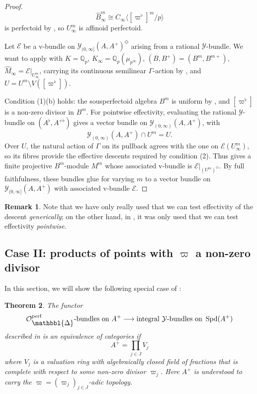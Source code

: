 \documentclass[10pt,twoside]{article}
\numberwithin{equation}{section}
\theoremstyle{plain}
\newtheorem{mythm}{Theorem}[section]
\theoremstyle{definition}
\newtheorem{myrem}[mythm]{Remark}
\DeclareMathOperator{\Spd}{Spd}
\newcommand{\QQ}{\mathbb{Q}}
\newcommand{\MCE}{\mathcal{E}}
\newcommand{\MCO}{\mathcal{O}}
\newcommand{\MCY}{\mathcal{Y}}
\let \diamond \Diamond
\DeclareMathOperator{\perf}{perf}
\newcommand{\Prism}{{\mathlarger{\mathbbl{\Delta}}}}
\newcommand{\Yoc}{\MCY_{(0,\infty]}}
\newcommand{\Yoo}{\MCY_{(0,\infty)}}
\newcommand{\OpP}{\MCO^{\perf}_{\Prism}}
\begin{document}
\begin{proof}
\[\hat B^m_\infty\cong C_\infty\langle [\varpi^\flat]^m/p\rangle\]
is perfectoid by \cite[Theorem 6.1.10]{SW20}, so \(U_\infty^m\) is affinoid perfectoid.\par
Let \(\MCE\) be a v-bundle on \(\Yoc(A,A^+)^\diamond\) arising from a rational \(\MCY\)-bundle. We want to apply  with \(K=\QQ_p\), \(K_\infty=\QQ_p(\mu_{p^\infty})\), \((B,B^+)=(B^m,B^{m+})\), \(\hat M_\infty=\MCE|_{U_\infty^m}\), carrying its continuous semilinear \(\Gamma\)-action by , and \(U=U^m\setminus V([\varpi^\flat])\).\par
Condition (1)(b) holds: the sousperfectoid algebra \(B^m\) is uniform by \cite[Proposition 6.3.4]{SW20}, and \([\varpi^\flat]\) is a non-zero divisor in \(B^m\). For pointwise effectivity, evaluating the rational \(\MCY\)-bundle on \((A^\flat,A^{+\flat})\) gives a vector bundle on \(\Yoo(A,A^+)\), with
\[\Yoo(A,A^+)\cap U^m=U.\]
Over \(U\), the natural action of \(\Gamma\) on its pullback agrees with the one on \(\MCE(U^m_\infty)\), so its fibres provide the effective descents required by condition (2). Thus  gives a finite projective \(B^m\)-module \(M^m\) whose associated v-bundle is \(\MCE|_{(U^m)^\diamond}\). By full faithfulness, these bundles glue for varying \(m\) to a vector bundle on \(\Yoc(A,A^+)\) with associated v-bundle \(\MCE\).
\end{proof}


\begin{myrem}
Note that we have only really used that we can test effectivity of the descent \emph{generically}; on the other hand, in \cite[Theorem 2.3.8]{PR}, it was only used that we can test effectivity \emph{pointwise}.
\end{myrem}
\subsection{\texorpdfstring{Case II: products of points with \(\varpi\) a non-zero divisor}
  {Case II: products of points with ϖ a non-zero divisor}}
In this section, we will show the following special case of :

\begin{mythm}\label{mainThmAnalytic}
The functor 
\[\text{\(\OpP\)-bundles on } A^+
\longrightarrow\text{integral \(\MCY\)-bundles on }\Spd(A^+)\]
described in  is an equivalence of categories if 
\[A^+=\prod_{j\in J} V_j\]
where \(V_j\) is a valuation ring with algebraically closed field of fractions that is complete with respect to some non-zero divisor \(\varpi_j\). Here \(A^+\) is understood to carry the \(\varpi = (\varpi_j)_{j\in J}\)-adic topology.
\end{mythm}
\end{document}
